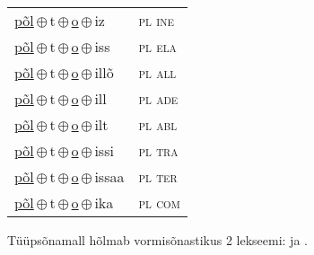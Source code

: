 \begin{minipage}{\textwidth}
\begin{sideways}
\begin{tabular}{l l}
\underline{põl}\,$\oplus$\,t\,$\oplus$\,\underline{o}\,$\oplus$\,iz & \textsc{ pl ine } \\
\underline{põl}\,$\oplus$\,t\,$\oplus$\,\underline{o}\,$\oplus$\,iss & \textsc{ pl ela } \\
\underline{põl}\,$\oplus$\,t\,$\oplus$\,\underline{o}\,$\oplus$\,illõ & \textsc{ pl all } \\
\underline{põl}\,$\oplus$\,t\,$\oplus$\,\underline{o}\,$\oplus$\,ill & \textsc{ pl ade } \\
\underline{põl}\,$\oplus$\,t\,$\oplus$\,\underline{o}\,$\oplus$\,ilt & \textsc{ pl abl } \\
\underline{põl}\,$\oplus$\,t\,$\oplus$\,\underline{o}\,$\oplus$\,issi & \textsc{ pl tra } \\
\underline{põl}\,$\oplus$\,t\,$\oplus$\,\underline{o}\,$\oplus$\,issaa & \textsc{ pl ter } \\
\underline{põl}\,$\oplus$\,t\,$\oplus$\,\underline{o}\,$\oplus$\,ika & \textsc{ pl com } \\
\end{tabular}
\end{sideways}
\label{tab:tüüpsõnamall-põlto}

\end{minipage}

 
\vspace{1em}
\noindent Tüüpsõnamall  hõlmab vormisõnastikus 2 lekseemi:  ja .
